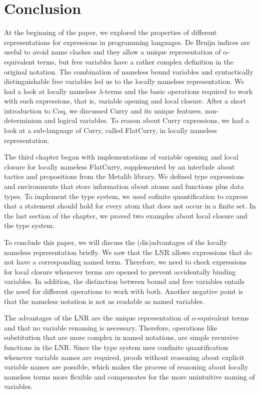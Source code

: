 \documentclass[a4paper, 11pt, fleqn]{scrreprt}
\begin{document}
\chapter{Conclusion}
	At the beginning of the paper, we explored the properties of different representations for expressions in programming languages. De Bruijn indices are useful to avoid name clashes and they allow a unique representation of $\alpha$-equivalent terms, but free variables have a rather complex definition in the original notation. The combination of nameless bound variables and syntactically distinguishable free variables led us to the locally nameless representation. We had a look at locally nameless $\lambda$-terms and the basic operations required to work with such expressions, that is, variable opening and local closure. After a short introduction to Coq, we discussed Curry and its unique features, non-determinism and logical variables. To reason about Curry expressions, we had a look at a sub-language of Curry, called FlatCurry, in locally nameless representation.\\
	\par
	The third chapter began with implementations of variable opening and local closure for locally nameless FlatCurry, supplemented by an interlude about tactics and propositions from the Metalib library. We defined type expressions and environments that store information about atoms and functions plus data types. To implement the type system, we used cofinite quantification to express that a statement should hold for every atom that does not occur in a finite set. In the last section of the chapter, we proved two examples about local closure and the type system.\\
	\par 
	To conclude this paper, we will discuss the (dis)advantages of the locally nameless representation briefly. We saw that the LNR allows expressions that do not have a corresponding named term. Therefore, we need to check expressions for local closure whenever terms are opened to prevent accidentally binding variables. In addition, the distinction between bound and free variables entails the need for different operations to work with both. Another negative point is that the nameless notation is not as readable as named variables.
	\par
	The advantages of the LNR are the unique representation of $\alpha$-equivalent terms and that no variable renaming is necessary. Therefore, operations like substitution that are more complex in named notations, are simple recursive functions in the LNR. Since the type system uses confinite quantification whenever variable names are required, proofs without reasoning about explicit variable names are possible, which makes the process of reasoning about locally nameless terms more flexible and compensates for the more unintuitive naming of variables.
\end{document}

